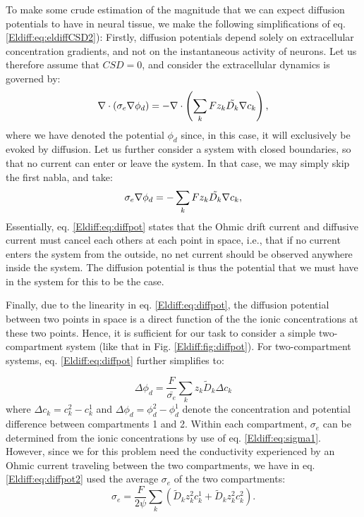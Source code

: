 \subsubsection{}
To make some crude estimation of the magnitude that we can expect diffusion potentials to have in neural tissue, we make the following simplifications of eq. \ref{Eldiff:eq:eldiffCSD2}): Firstly, diffusion potentials depend solely on extracellular concentration gradients, and not on the instantaneous activity of neurons. Let us therefore assume that $CSD = 0$, and consider the extracellular dynamics is governed by:
\begin{equation}
\nabla \cdot (\sigma_e\nabla\phi_d) = - \nabla \cdot \left (\sum_k{F z_k \tilde{D_k}{\bf \nabla} c_{k}} \right), 
\label{Eldiff:eq:eldiffCSD3}
\end{equation}
where we have denoted the potential $\phi_d$ since, in this case, it will exclusively be evoked by diffusion. Let us further consider a system with closed boundaries, so that no current can enter or leave the system. In that case, we may simply skip the first nabla, and take:
\begin{equation}
\sigma_e\nabla\phi_d = -\sum_k{F z_k \tilde{D_k}{\bf \nabla} c_{k}}, 
\label{Eldiff:eq:diffpot}
\end{equation}
Essentially, eq. \ref{Eldiff:eq:diffpot} states that the Ohmic drift current and diffusive current must cancel each others at each point in space, i.e., that if no current enters the system from the outside, no net current should be observed anywhere inside the system. The diffusion potential is thus the potential that we must have in the system for this to be the case. 

Finally, due to the linearity in eq. \ref{Eldiff:eq:diffpot}, the diffusion potential between two points in space is a direct function of the the ionic concentrations at these two points. Hence, it is sufficient for our task to consider a simple two-compartment system (like that in Fig. \ref{Eldiff:fig:diffpot}). For two-compartment systems, eq. \ref{Eldiff:eq:diffpot} further simplifies to:

\begin{equation}
\Delta \phi_d = \frac{F}{\bar{\sigma_e}} \sum_k{z_k \tilde{D}_k \Delta c_k}
\label{Eldiff:eq:diffpot2}
\end{equation}
where $\Delta c_k = c_{k}^{2} - c_{k}^{1}$ and $\Delta \phi_d = \phi_d^{2} - \phi_d^{1}$ denote the concentration and potential difference between compartments 1 and 2. Within each compartment, $\sigma_e$ can be determined from the ionic concentrations by use of eq. \ref{Eldiff:eq:sigma1}. However, since we for this problem need the conductivity experienced by an Ohmic current traveling between the two compartments, we have in eq. \ref{Eldiff:eq:diffpot2} used the average $\sigma_e$ of the two compartments:
\begin{equation}
\sigma_e = \frac{F}{2\psi}\sum_{k} \left(\tilde{D}_k z_{k}^2 c_{k}^{1} + \tilde{D}_k z_{k}^2 c_{k}^{2} \right).
\label{Eldiff:eq:sigma2}
\end{equation}

